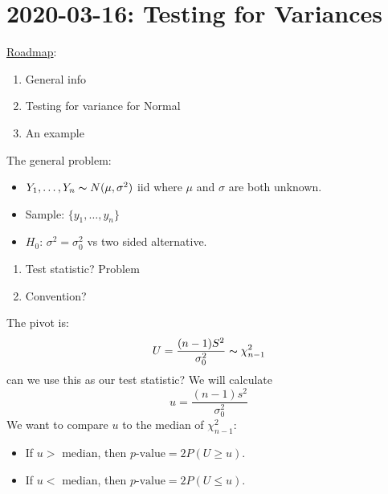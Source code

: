 \section{2020-03-16: Testing for Variances}
\underline{Roadmap}:
\begin{enumerate}[label=(\roman*)]
    \item General info
    \item Testing for variance for Normal
    \item An example
\end{enumerate}
The general problem:
\begin{itemize}
    \item $ Y_1,\ldots ,Y_n \thicksim N(\mu,\sigma^2)$ iid
          where $ \mu $ and $ \sigma $ are both unknown.
    \item Sample: $ \{y_1,\ldots ,y_n\} $
    \item $ H_0 $: $ \sigma^2=\sigma_0^2 $ vs two sided alternative.
\end{itemize}

\begin{enumerate}[label=(\roman*)]
    \item Test statistic? Problem
    \item Convention?
\end{enumerate}
The pivot is:
\[ U=\frac{(n-1)S^2}{\sigma_0^2} \thicksim \chi^2_{n-1} \]
can we use this as our test statistic? We will calculate
\[ u=\frac{(n-1)s^2}{\sigma_0^2} \]
We want to compare $ u $ to the median of $ \chi^2_{n-1} $:
\begin{itemize}
    \item If $ u> $ median, then $ p\text{-value}=2P(U\geqslant u) $.
    \item If $ u< $ median, then $ p\text{-value}=2P(U\leqslant u) $.
\end{itemize}

